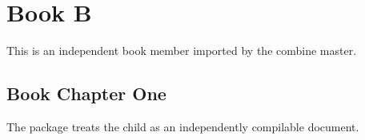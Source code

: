 \documentclass{article}
\begin{document}
\section{Book B}
This is an independent book member imported by the combine master.
\subsection{Book Chapter One}
The package treats the child as an independently compilable document.
\end{document}
